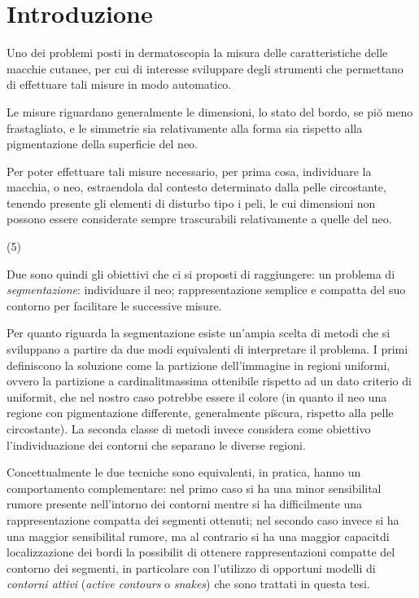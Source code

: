 \chapter{Introduzione}
Uno dei problemi posti in dermatoscopia \e la misura delle caratteristiche delle macchie
cutanee, per cui \e di interesse sviluppare degli strumenti che permettano di effettuare
tali misure in modo automatico.

Le misure riguardano generalmente le dimensioni, lo stato del bordo, se \e pi\u o meno
frastagliato, e le simmetrie sia relativamente alla forma sia rispetto alla pigmentazione
della superficie del neo.

Per poter effettuare tali misure \e necessario, per prima cosa, individuare la macchia, o neo,
estraendola dal contesto determinato dalla pelle circostante, tenendo presente gli elementi di
disturbo tipo i peli, le cui dimensioni non possono essere considerate sempre trascurabili
relativamente a quelle del neo.

\vs(5)

Due sono quindi gli obiettivi che ci si \e proposti di raggiungere:
\ben
\im un problema di {\it segmentazione}: individuare il neo;
\im rappresentazione semplice e compatta del suo contorno per facilitare le successive misure.
\een

Per quanto riguarda la segmentazione esiste un'ampia scelta di metodi che si sviluppano a
partire da due modi equivalenti di interpretare il problema.
I primi definiscono la soluzione come la partizione dell'immagine in regioni uniformi, ovvero
la partizione a cardinalit\a massima ottenibile rispetto ad un dato criterio di uniformit\aac,
che nel nostro caso potrebbe essere il colore (in quanto il neo \e una regione con
pigmentazione differente, generalmente pi\u scura, rispetto alla pelle circostante).
La seconda classe di metodi invece considera come obiettivo l'individuazione dei contorni che
separano le diverse regioni.

Concettualmente le due tecniche sono equivalenti, in pratica, hanno un comportamento
complementare: nel primo caso si ha una minor sensibilit\a al rumore presente
nell'intorno dei contorni mentre si ha difficilmente una rappresentazione compatta dei
segmenti ottenuti; nel secondo caso invece si ha una maggior sensibilit\a al rumore,
ma al contrario si ha una maggior capacit\a di localizzazione dei bordi \e la possibilit\a
di ottenere rappresentazioni compatte del contorno dei segmenti, in particolare con l'utilizzo
di opportuni modelli di {\it contorni attivi} ({\it active contours} o {\it snakes}) che sono
trattati in questa tesi.

